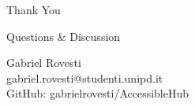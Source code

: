 \documentclass[10pt,aspectratio=169]{beamer}
\newenvironment{emptyframe}[1][]{\begin{frame}[plain,#1]}{\end{frame}}
\begin{document}
\begin{emptyframe}
    \begin{center}
        \Huge Thank You
        
        \vspace{1cm}
        
        \Large Questions \& Discussion
        
        \vspace{1cm}
        
        \normalsize
        Gabriel Rovesti \\
        gabriel.rovesti@studenti.unipd.it \\
        GitHub: gabrielrovesti/AccessibleHub
    \end{center}
\end{emptyframe}
\end{document}
